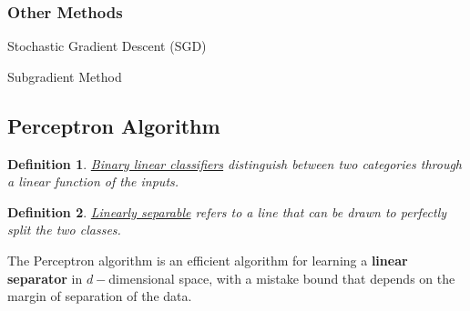 \documentclass[11pt,a4paper]{article}
\newtheorem{definition}{Definition}
\begin{document}
\begin{center}
\end{center}

\subsubsection{Other Methods}
Stochastic Gradient Descent (SGD)

Subgradient Method

\subsection{Perceptron Algorithm}
\begin{definition}
    \underline{Binary linear classifiers} distinguish between two categories through a linear function of the inputs.
\end{definition}

\begin{definition}
    \underline{Linearly separable} refers to a line that can be drawn to perfectly split the two classes.
\end{definition}

The Perceptron algorithm is an efficient algorithm for learning a \textbf{linear separator} in $d-$dimensional space, with a mistake bound that depends on the margin of separation of the data.
\end{document}
